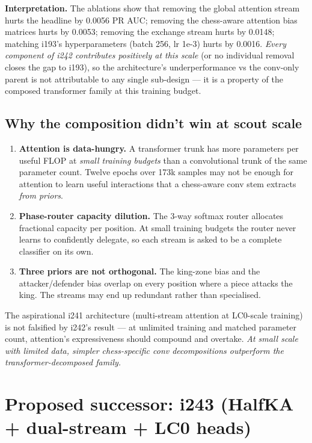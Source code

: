 \documentclass[10pt,a4paper]{article}
\begin{document}
\textbf{Interpretation.} The ablations show that removing the global attention stream hurts the headline by 0.0056 PR AUC; removing the chess-aware attention bias matrices hurts by 0.0053; removing the exchange stream hurts by 0.0148; matching i193's hyperparameters (batch 256, lr 1e-3) hurts by 0.0016. \emph{Every component of i242 contributes positively at this scale} (or no individual removal closes the gap to i193), so the architecture's underperformance vs the conv-only parent is not attributable to any single sub-design --- it is a property of the composed transformer family at this training budget.

\subsection{Why the composition didn't win at scout scale}

\begin{enumerate}
\item \textbf{Attention is data-hungry.} A transformer trunk has more
parameters per useful FLOP at \emph{small training budgets} than a
convolutional trunk of the same parameter count. Twelve epochs over
173k samples may not be enough for attention to learn useful interactions
that a chess-aware conv stem extracts \emph{from priors}.
\item \textbf{Phase-router capacity dilution.} The 3-way softmax router
allocates fractional capacity per position. At small training budgets the
router never learns to confidently delegate, so each stream is asked to be
a complete classifier on its own.
\item \textbf{Three priors are not orthogonal.} The king-zone bias and the
attacker/defender bias overlap on every position where a piece attacks the
king. The streams may end up redundant rather than specialised.
\end{enumerate}

The aspirational i241 architecture (multi-stream attention at LC0-scale
training) is not falsified by i242's result --- at unlimited training and
matched parameter count, attention's expressiveness should compound and
overtake. \emph{At small scale with limited data, simpler chess-specific
conv decompositions outperform the transformer-decomposed family.}

\clearpage
\section{Proposed successor: i243 (HalfKA + dual-stream + LC0 heads)}
\end{document}
